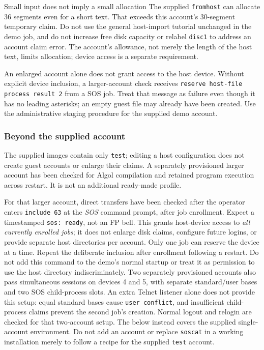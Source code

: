 \begin{operationnote}{Small input does not imply a small allocation}
The supplied \texttt{fromhost} can allocate 36 segments even for a short
text. That exceeds this account's 30-segment temporary claim. Do not use
the general host-import tutorial unchanged in the demo job, and do not
increase free disk capacity or relabel \texttt{disc1} to address an account
claim error. The account's allowance, not merely the length of the host text,
limits allocation; device access is a separate requirement.

An enlarged account alone does not grant access to the host device.
Without explicit device inclusion, a larger-account check receives
\texttt{reserve host-file process result 2} from a SOS job. Treat that message
as failure even though it has no leading asterisks; an empty guest file may
already have been created. Use the administrative staging procedure for the
supplied demo account.

\end{operationnote}

\subsubsection{Beyond the supplied account}\label{mips-ts-provisioned-accounts}

The supplied images contain only \texttt{test}; editing a host configuration
does not create guest accounts or enlarge their claims. A separately
provisioned larger account has been checked for Algol compilation and retained
program execution across restart. It is not an additional ready-made profile.

For that larger account, direct transfers have been
checked after the operator enters \texttt{include 63} at the \emph{SOS}
command prompt, after job enrollment. Expect a timestamped
\texttt{sos: ready}, not an FP bell. This grants host-device access to
\emph{all currently enrolled jobs}; it does not enlarge disk claims, configure
future logins, or provide separate host directories per account. Only one job
can reserve the device at a time. Repeat the deliberate inclusion after
enrollment following a restart. Do not add this command to the demo's normal
startup or treat it as permission to use the host directory indiscriminately.
Two separately provisioned accounts also pass simultaneous sessions on devices
4 and 5, with separate standard/user
bases and two SOS child-process slots. An extra Telnet listener alone does
not provide this setup: equal standard bases cause \texttt{user conflict},
and insufficient child-process claims prevent the second job's creation.
Normal logout and relogin are checked for that two-account setup. The
 below instead
covers the supplied single-account environment. Do not add an account or
replace \texttt{soscat} in a working installation merely to follow a recipe
for the supplied \texttt{test} account.

